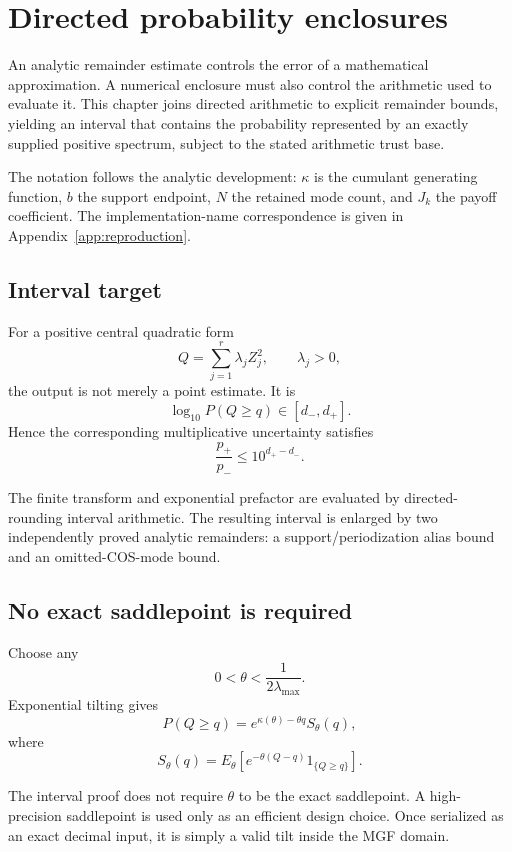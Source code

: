 \chapter{Directed probability enclosures}\label{ch:intervals}

\label{sec:final-4}

An analytic remainder estimate controls the error of a mathematical
approximation. A numerical enclosure must also control the arithmetic used
to evaluate it. This chapter joins directed arithmetic to explicit
remainder bounds, yielding an interval that contains the probability
represented by an exactly supplied positive spectrum, subject to the stated
arithmetic trust base.

The notation follows the analytic development: $\kappa$ is the cumulant generating function, $b$ the support endpoint, $N$ the retained mode count, and $J_k$ the payoff coefficient. The implementation-name correspondence is given in Appendix~\ref{app:reproduction}.

\section{Interval target}

For a positive central quadratic form
\[
Q=\sum_{j=1}^{r}\lambda_jZ_j^2,
\qquad
\lambda_j>0,
\]
the output is not merely a point estimate.  It is
\[
\boxed{
\log_{10}P(Q\ge q)\in[d_-,d_+].
}
\]
Hence the corresponding multiplicative uncertainty satisfies
\[
\boxed{
\frac{p_+}{p_-}\le 10^{d_+-d_-}.
}
\]

The finite transform and exponential prefactor are evaluated by
directed-rounding interval arithmetic.  The resulting interval is enlarged by
two independently proved analytic remainders: a support/periodization alias
bound and an omitted-COS-mode bound.

\section{No exact saddlepoint is required}

Choose any
\[
0<\theta<\frac{1}{2\lambda_{\max}}.
\]
Exponential tilting gives
\[
P(Q\ge q)
=
e^{\kappa(\theta)-\theta q}
S_\theta(q),
\]
where
\[
S_\theta(q)
=
E_\theta\!\left[
e^{-\theta(Q-q)}
1_{\{Q\ge q\}}
\right].
\]

The interval proof does not require \(\theta\) to be the exact saddlepoint.
A high-precision saddlepoint is used only as an efficient design choice.
Once serialized as an exact decimal input, it is simply a valid tilt inside
the MGF domain.

